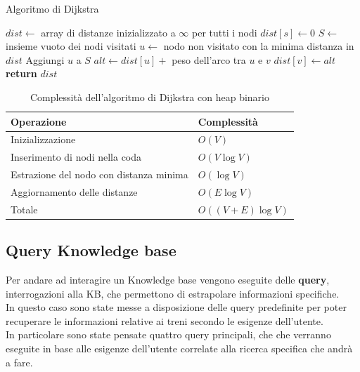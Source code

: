 \documentclass[italian,12pt,a4paper]{article}
\begin{document}
	\begin{algorithm}[h]
		\caption{Algoritmo di Dijkstra}
		\begin{algorithmic}[1]
			\State $dist \gets$ array di distanze inizializzato a $\infty$ per tutti i nodi
			\State $dist[s] \gets 0$
			\State $S \gets$ insieme vuoto dei nodi visitati
			\State $u \gets$ nodo non visitato con la minima distanza in $dist$
			\State Aggiungi $u$ a $S$
			\State $alt \gets dist[u] +$ peso dell'arco tra $u$ e $v$
			\State $dist[v] \gets alt$
			\EndIf
			\EndFor
			\EndWhile
			\State \textbf{return} $dist$ 
			\EndProcedure
		\end{algorithmic}
	\end{algorithm}
	\vspace{200px}
	
	\begin{table}[h]
		\centering
		\begin{tabular}{|l|l|}
			\hline
			\textbf{Operazione} & \textbf{Complessità} \\ \hline
			Inizializzazione & $O(V)$ \\ \hline
			Inserimento di nodi nella coda & $O(V \log V)$ \\ \hline
			Estrazione del nodo con distanza minima & $O(\log V)$ \\ \hline
			Aggiornamento delle distanze & $O(E \log V)$ \\ \hline
			Totale & $O((V + E) \log V)$ \\ \hline
		\end{tabular}
		\caption{Complessità dell'algoritmo di Dijkstra con heap binario}
	\end{table}
	
	\vspace{20px}

	\subsection{Query Knowledge base}
	Per andare ad interagire un Knowledge base vengono eseguite delle \textbf{query}, interrogazioni alla KB, che permettono di estrapolare informazioni specifiche.\\
	In questo caso sono state messe a disposizione delle query predefinite per poter recuperare le informazioni relative ai treni secondo le esigenze dell'utente. \\
	In particolare sono state pensate quattro query principali, che che verranno eseguite in base alle esigenze dell'utente correlate alla ricerca specifica che andrà a fare.\\
	\linebreak
	\newpage
\end{document}
